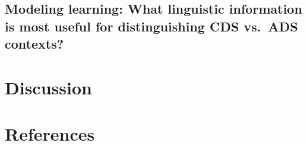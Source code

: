 \documentclass[10pt, letterpaper]{article}
\begin{document}
\hypertarget{modeling-learning-what-linguistic-information-is-most-useful-for-distinguishing-cds-vs.-ads-contexts}{%
\subsection{Modeling learning: What linguistic information is most
useful for distinguishing CDS vs.~ADS
contexts?}\label{modeling-learning-what-linguistic-information-is-most-useful-for-distinguishing-cds-vs.-ads-contexts}}

\hypertarget{discussion}{%
\section{Discussion}\label{discussion}}

\hypertarget{references}{%
\section{References}\label{references}}

\setlength{\parindent}{-0.1in} 
\setlength{\leftskip}{0.125in}

\noindent
\end{document}
